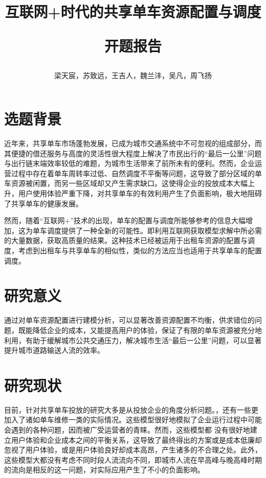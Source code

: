 \documentclass [16pt] {ctexart}
\title{互联网+时代的共享单车资源配置与调度

开题报告}
\author{梁天宸，苏致远，王吉人，魏兰沣，吴凡，周飞扬}
\date{}
\begin{document}
\maketitle

\section{选题背景}

\par{近年来，共享单车市场蓬勃发展，已成为城市交通系统中不可忽视的组成部分，而其便捷的借还服务与高度的灵活性很大程度上解决了市民出行的“最后一公里”问题与出行链末端效率较低的难题，为城市生活带来了前所未有的便利。然而，企业运营过程中存在着单车周转率过低、自然调度不平衡等问题，这导致了部分区域的单车资源被闲置，而另一些区域却又产生需求缺口。这使得企业的投放成本大幅上升，用户使用体验严重下降，对共享单车的有效利用产生了负面影响，极大地阻碍了共享单车的健康发展。}
\par{然而，随着“互联网+”技术的出现，单车的配置与调度所能够参考的信息大幅增加，这为单车调度提供了一种全新的可能性。即利用互联网获取模型求解中所必需的大量数据，获取高质量的结果。这种技术已经被运用于出租车资源的配置与调度\textsuperscript{\cite{安晓丹2015互联网+}}，考虑到出租车与共享单车的相似性，类似的方法应当也适用于共享单车的配置调度。}

\section{研究意义}
\par{通过对单车资源配置进行建模分析，可以显著改善资源配置不均衡，供求错位的问题，既能降低企业的成本，又能提高用户的体验，保证了有限的单车资源被充分地利用，有助于缓解城市公共交通压力，解决城市生活“最后一公里”问题，可以显著提升城市道路输送人流的效率。}

\section{研究现状}
\par{目前，针对共享单车投放的研究大多是从投放企业的角度分析问题。\textsuperscript{\cite{于德新2020共享单车调度模型及算法研究}\cite{陈佳惠2021共享单车调度路径优化研究}}，还有一些更加入了诸如单车维修一类的实际情况。\textsuperscript{\cite{王涵霄2019考虑维修的共享单车调度优化研究}}这些模型很好地模拟了企业运行过程中可能会遇到的各种问题，因而被广受运营者的青睐。然而，这些模型都 没有很好地建立用户体验和企业成本之间的平衡关系，这导致了最终得出的方案或是成本低廉却忽视了用户体验，或是用户体验良好却成本高昂，产生诸多的不合理之处。此外，这些模型大都没有考虑不同时段人流流向不同，即城市人流在早高峰与晚高峰时期的流向是相反的这一问题，对实际应用产生了不小的负面影响。}
\end{document}
